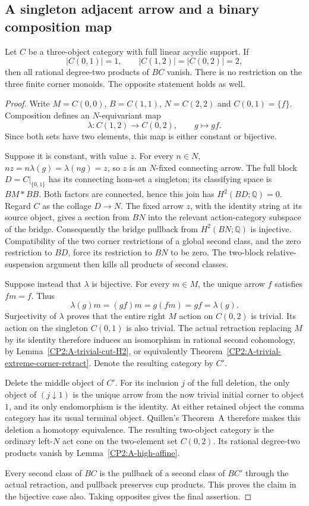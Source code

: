 \subsection{A singleton adjacent arrow and a binary composition map}

\begin{proposition}
\label{CP2:A-singleton-binary-triangle-all-corners}
Let $C$ be a three-object category with full linear acyclic support.
If
\[
 |C(0,1)|=1,\qquad |C(1,2)|=|C(0,2)|=2,
\]
then all rational degree-two products of $BC$ vanish.  There is
no restriction on the three finite corner monoids.  The opposite
statement holds as well.
\end{proposition}
\begin{proof}
Write $M=C(0,0)$, $B=C(1,1)$, $N=C(2,2)$ and
$C(0,1)=\{f\}$.  Composition defines an $N$-equivariant map
\[
 \lambda:C(1,2)\longrightarrow C(0,2),\qquad g\longmapsto gf.
\]
Since both sets have two elements, this map is either constant or
bijective.

Suppose it is constant, with value $z$.  For every $n\in N$,
$nz=n\lambda(g)=\lambda(ng)=z$, so $z$ is an $N$-fixed
connecting arrow.  The full block $D=C|_{\{0,1\}}$ has its
connecting hom-set a singleton; its classifying space is
$BM*BB$.  Both factors are connected, hence this join has
$H^2(BD;\mathbb Q)=0$.  Regard $C$ as the collage $D\to N$.
The fixed arrow $z$, with the identity string at its source object,
gives a section from $BN$ into the relevant action-category
subspace of the bridge.  Consequently the bridge pullback from
$H^2(BN;\mathbb Q)$ is injective.  Compatibility of the two
corner restrictions of a global second class, and the zero
restriction to $BD$, force its restriction to $BN$ to be zero.
The two-block relative-suspension argument then kills all products
of second classes.

Suppose instead that $\lambda$ is bijective.  For every $m\in M$,
the unique arrow $f$ satisfies $fm=f$.  Thus
\[
       \lambda(g)m=(gf)m=g(fm)=gf=\lambda(g).
\]
Surjectivity of $\lambda$ proves that the entire right $M$ action
on $C(0,2)$ is trivial.  Its action on the singleton $C(0,1)$
is also trivial.  The actual retraction replacing $M$ by its
identity therefore induces an isomorphism in rational second
cohomology, by Lemma~\ref{CP2:A-trivial-cut-H2}, or equivalently
Theorem~\ref{CP2:A-trivial-extreme-corner-retract}.
Denote the resulting category by $C'$.

Delete the middle object of $C'$.  For its inclusion $j$ of the
full deletion, the only object of $(j\downarrow1)$ is the unique
arrow from the now trivial initial corner to object $1$, and its
only endomorphism is the identity.  At either retained object the
comma category has its usual terminal object.  Quillen's
Theorem~A therefore makes this deletion a homotopy equivalence.
The resulting two-object category is the ordinary left-$N$ act
cone on the two-element set $C(0,2)$.  Its rational degree-two
products vanish by Lemma~\ref{CP2:A-high-affine}.

Every second class of $BC$ is the pullback of a second class of
$BC'$ through the actual retraction, and pullback preserves cup
products.  This proves the claim in the bijective case also.
Taking opposites gives the final assertion.
\end{proof}
